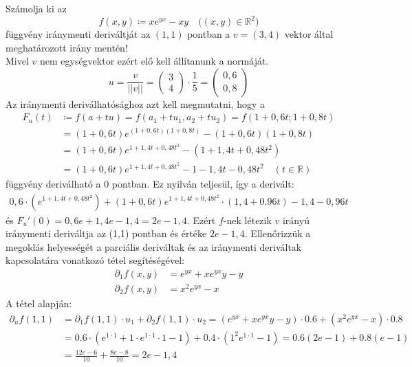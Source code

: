 \documentclass[a4paper,12pt]{article}
\theoremstyle{definition}
\begin{document}
	\begin{question}
		Számolja ki az
		\[
		f(x,y) \coloneq xe^{yx}-xy \quad \bigl( (x,y) \in \mathbb{R}^2 \bigr)
		\]
		függvény iránymenti deriváltját az $(1,1)$ pontban a $v = (3,4)$ vektor által meghatározott irány mentén!
		\\[4pt]
		Mivel $v$ nem egységvektor ezért elő kell állítanunk a normáját.
		\[
		u = \frac{v}{||v||} = \begin{pmatrix} 3 \\ 4 \end{pmatrix} \cdot \frac{1}{5} = \begin{pmatrix} 0,6 \\ 0,8 \end{pmatrix}
		\]
		Az iránymenti deriválhatósághoz azt kell megmutatni, hogy a
		\begin{align*}
			F_u(t) &\coloneq f(a + tu) = f(a_1 + tu_1, a_2 + tu_2) = f(1 + 0,6t; 1 + 0,8t) \\
			&= (1 + 0,6t)e^{(1+0,6t)(1+0,8t)} - (1+0,6t)(1+0,8t) \\
			&= (1 + 0,6t)e^{1+1,4t+0,48t^2} - (1+1,4t+0,48t^2) \\
			&= (1 + 0,6t)e^{1+1,4t+0,48t^2} - 1 - 1,4t - 0,48t^2 \quad (t \in \mathbb{R})
		\end{align*}
		függvény deriválható a 0 pontban.
		Ez nyilván teljesül, így a derivált:
		\begin{align*}
			0,6 \cdot (e^{1+1,4t+0,48t^2}) + (1 + 0,6t)e^{1+1,4t+0,48t^2} \cdot (1,4 + 0.96t) - 1,4 -0,96t
		\end{align*}
		 és $F_u'(0) = 0,6e + 1,4e - 1,4 = 2e - 1,4 $. Ezért $f$-nek létezik $v$ irányú iránymenti deriváltja az (1,1) pontban és értéke $2e - 1,4$.
		 Ellenőrizzük a megoldás helyességét a parciális deriváltak és az iránymenti deriváltak kapcsolatára vonatkozó tétel segítéségével:
		\begin{align*}
			\partial_1f(x,y) &= e^{yx} + xe^{yx}y - y \\
			\partial_2f(x,y) &= x^2e^{yx} - x
		\end{align*}
		A tétel alapján:
		\begin{align*}
			\partial_uf(1,1) &= \partial_1f(1,1) \cdot u_1 + \partial_2f(1,1) \cdot u_2 =  ( e^{yx} + xe^{yx}y - y ) \cdot 0.6 + ( x^2e^{yx} - x ) \cdot 0.8 \\
			&= 0.6 \cdot ( e^{1 \cdot 1} + 1 \cdot e^{1 \cdot 1} \cdot 1 - 1) + 0.4 \cdot (1^2e^{1 \cdot 1} - 1) = 0.6(2e-1)+0.8(e-1) \\
			&=  \frac{12e-6}{10} + \frac{8e-8}{10} = 2e -1,4
		\end{align*}
	\end{question}
\end{document}
